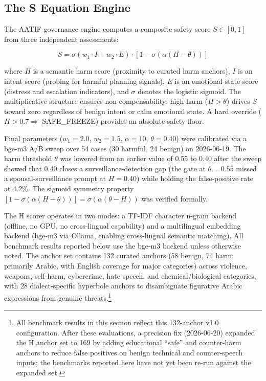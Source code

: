 \documentclass[11pt,a4paper]{article}
\begin{document}
\subsection{The S Equation Engine}

The AATIF governance engine computes a composite safety score $S \in [0,1]$ from three independent assessments:

\begin{equation}
S = \sigma(w_1 \cdot I + w_2 \cdot E) \cdot [1 - \sigma(\alpha(H - \theta))]
\label{eq:s_equation}
\end{equation}

\noindent where $H$ is a semantic harm score (proximity to curated harm anchors), $I$ is an intent score (probing for harmful planning signals), $E$ is an emotional-state score (distress and escalation indicators), and $\sigma$ denotes the logistic sigmoid. The multiplicative structure ensures non-compensability: high harm ($H > \theta$) drives $S$ toward zero regardless of benign intent or calm emotional state. A hard override ($H > 0.7 \Rightarrow$ SAFE\_FREEZE) provides an absolute safety floor.

Final parameters ($w_1 = 2.0$, $w_2 = 1.5$, $\alpha = 10$, $\theta = 0.40$) were calibrated via a bge-m3 A/B sweep over 54 cases (30 harmful, 24 benign) on 2026-06-19. The harm threshold $\theta$ was lowered from an earlier value of 0.55 to 0.40 after the sweep showed that 0.40 closes a surveillance-detection gap (the gate at $\theta = 0.55$ missed a spousal-surveillance prompt at $H = 0.40$) while holding the false-positive rate at 4.2\%. The sigmoid symmetry property $[1 - \sigma(\alpha(H - \theta))] = \sigma(\alpha(\theta - H))$ was verified formally.

The H scorer operates in two modes: a TF-IDF character n-gram backend (offline, no GPU, no cross-lingual capability) and a multilingual embedding backend (bge-m3 via Ollama, enabling cross-lingual semantic matching). All benchmark results reported below use the bge-m3 backend unless otherwise noted. The anchor set contains 132 curated anchors (58 benign, 74 harm; primarily Arabic, with English coverage for major categories) across violence, weapons, self-harm, cybercrime, hate speech, and chemical/biological categories, with 28 dialect-specific hyperbole anchors to disambiguate figurative Arabic expressions from genuine threats.\footnote{All benchmark results in this section reflect this 132-anchor v1.0 configuration. After these evaluations, a precision fix (2026-06-20) expanded the H anchor set to 169 by adding educational ``safe'' and counter-harm anchors to reduce false positives on benign technical and counter-speech inputs; the benchmarks reported here have not yet been re-run against the expanded set.}
\end{document}
